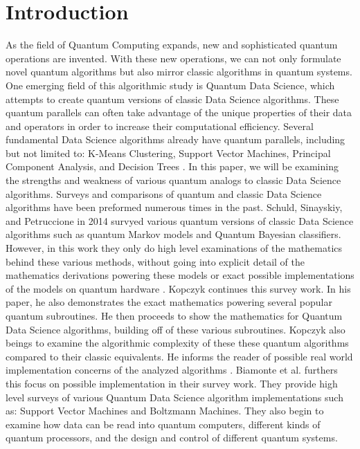 \documentclass[conference]{IEEEtran}
\begin{document}
\section{Introduction}
As the field of Quantum Computing expands, new and sophisticated quantum operations are invented. With these new operations, we can not only formulate novel quantum algorithms but also mirror classic algorithms in quantum systems. One emerging field of this algorithmic study is Quantum Data Science, which attempts to create quantum versions of classic Data Science algorithms. These quantum parallels can often take advantage of the unique properties of their data and operators in order to increase their computational efficiency. Several fundamental Data Science algorithms already have quantum parallels, including but not limited to: K-Means Clustering, Support Vector Machines, Principal Component Analysis, and Decision Trees \cite{b1} \cite{b2} \cite{b3} \cite{b4}. 
\newline
\indent In this paper, we will be examining the strengths and weakness of various quantum analogs to classic Data Science algorithms. Surveys and comparisons of quantum and classic Data Science algorithms have been preformed numerous times in the past. Schuld, Sinayskiy, and Petruccione in 2014 survyed various quantum versions of classic Data Science algorithms such as quantum Markov models and Quantum Bayesian classifiers. However, in this work they only do high level examinations of the mathematics behind these various methods, without going into explicit detail of the mathematics derivations powering these models or exact possible implementations of the models on quantum hardware \cite{b5}.
\newline
\indent Kopczyk continues this survey work. In his paper, he also demonstrates the exact mathematics powering several popular quantum subroutines. He then proceeds to show the mathematics for Quantum Data Science algorithms, building off of these various subroutines. Kopczyk also beings to examine the algorithmic complexity of these these quantum algorithms compared to their classic equivalents. He informs the reader of possible real world implementation concerns of the analyzed algorithms \cite{b6}. 
\newline
\indent Biamonte et al. furthers this focus on possible implementation in their survey work. They provide high level surveys of various Quantum Data Science algorithm implementations such as: Support Vector Machines and Boltzmann Machines. They also begin to examine how data can be read into quantum computers, different kinds of quantum processors, and the design and control of different quantum systems.\cite{b7}
\end{document}
